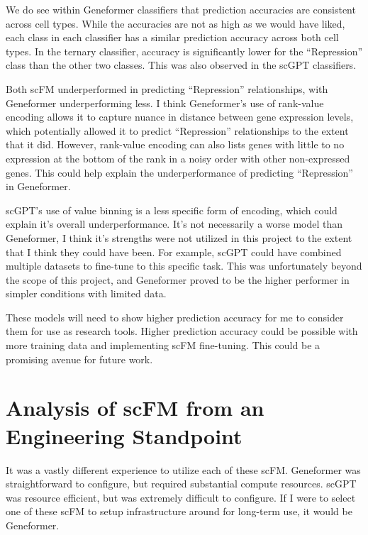\documentclass[12pt, letterpaper]{report}
\let\oldsection\section
\renewcommand{\section}{\clearpage\oldsection}
\begin{document}
We do see within Geneformer classifiers that prediction accuracies are consistent across cell types. While the accuracies are not as high as we would have liked, each class in each classifier has a similar prediction accuracy across both cell types. In the ternary classifier, accuracy is significantly lower for the ``Repression'' class than the other two classes. This was also observed in the scGPT classifiers.

Both scFM underperformed in predicting ``Repression'' relationships, with Geneformer underperforming less. I think Geneformer's use of rank-value encoding allows it to capture nuance in distance between gene expression levels, which potentially allowed it to predict ``Repression'' relationships to the extent that it did. However, rank-value encoding can also lists genes with little to no expression at the bottom of the rank in a noisy order with other non-expressed genes. This could help explain the underperformance of predicting  ``Repression'' in Geneformer.

scGPT's use of value binning is a less specific form of encoding, which could explain it's overall underperformance. It's not necessarily a worse model than Geneformer, I think it's strengths were not utilized in this project to the extent that I think they could have been. For example, scGPT could have combined multiple datasets to fine-tune to this specific task. This was unfortunately beyond the scope of this project, and Geneformer proved to be the higher performer in simpler conditions with limited data.


These models will need to show higher prediction accuracy for me to consider them for use as research tools. Higher prediction accuracy could be possible with more training data and implementing scFM fine-tuning. This could be a promising avenue for future work.

\section{Analysis of scFM from an Engineering Standpoint}

It was a vastly different experience to utilize each of these scFM. Geneformer was straightforward to configure, but required substantial compute resources. scGPT was resource efficient, but was extremely difficult to configure. If I were to select one of these scFM to setup infrastructure around for long-term use, it would be Geneformer.
\end{document}
